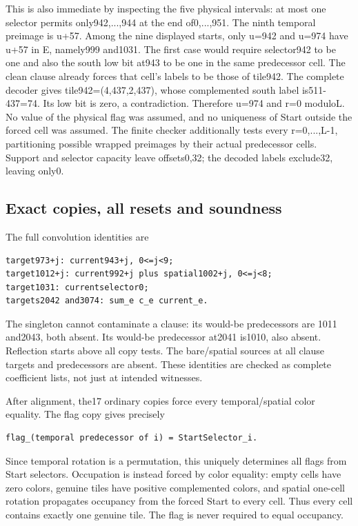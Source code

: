 This is also immediate by inspecting the five physical intervals: at most one selector permits only942,...,944 at the end of0,...,951. The ninth temporal preimage is u+57. Among the nine displayed starts, only u=942 and u=974 have u+57 in E, namely999 and1031. The first case would require selector942 to be one and also the south low bit at943 to be one in the same predecessor cell. The clean clause already forces that cell's labels to be those of tile942. The complete decoder gives tile942=(4,437,2,437), whose complemented south label is511-437=74. Its low bit is zero, a contradiction. Therefore u=974 and r=0 moduloL. No value of the physical flag was assumed, and no uniqueness of Start outside the forced cell was assumed. The finite checker additionally tests every r=0,...,L-1, partitioning possible wrapped preimages by their actual predecessor cells. Support and selector capacity leave offsets0,32; the decoded labels exclude32, leaving only0.

\subsection{Exact copies, all resets and soundness}
The full convolution identities are

\begin{Verbatim}[fontsize=\small,breaklines=true,breakanywhere=true,breaksymbolleft={}]
target973+j: current943+j, 0<=j<9;
target1012+j: current992+j plus spatial1002+j, 0<=j<8;
target1031: currentselector0;
targets2042 and3074: sum_e c_e current_e.
\end{Verbatim}

The singleton cannot contaminate a clause: its would-be predecessors are 1011 and2043, both absent. Its would-be predecessor at2041 is1010, also absent. Reflection starts above all copy tests. The bare/spatial sources at all clause targets and predecessors are absent. These identities are checked as complete coefficient lists, not just at intended witnesses.

After alignment, the17 ordinary copies force every temporal/spatial color equality. The flag copy gives precisely

\begin{Verbatim}[fontsize=\small,breaklines=true,breakanywhere=true,breaksymbolleft={}]
flag_(temporal predecessor of i) = StartSelector_i.
\end{Verbatim}

Since temporal rotation is a permutation, this uniquely determines all flags from Start selectors. Occupation is instead forced by color equality: empty cells have zero colors, genuine tiles have positive complemented colors, and spatial one-cell rotation propagates occupancy from the forced Start to every cell. Thus every cell contains exactly one genuine tile. The flag is never required to equal occupancy.


